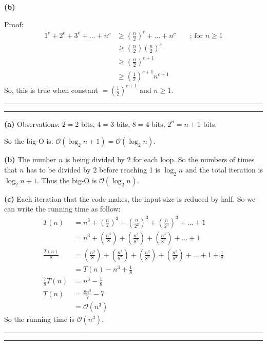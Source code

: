 \documentclass[a4paper, 12pt]{article}
\newcommand{\question}[1] {\vspace{.25in} \hrule\vspace{0.5em}
\noindent{\bf #1} \vspace{0.5em}
\hrule \vspace{.10in}}
\renewcommand{\part}[1] {\vspace{10pt} {\bf (#1)}}
\begin{document}
\part{b}

Proof:
\begin{align*}
	1^c + 2^c +3^c +...+n^c &\geqslant (\frac{n}{2})^c + ... + n^c && \text{ ; for } n\geqslant 1 \\
	&\geqslant (\frac{n}{2})(\frac{n}{2})^c \\
	& \geqslant (\frac{n}{2})^{c+1}\\
	& \geqslant (\frac{1}{2})^{c+1} n^{c+1}
\end{align*}
So, this is true when constant $= (\frac{1}{2})^{c+1}$ and $n \geqslant 1$.


\question{Problem 4}
\part{a} Observations: $2 = 2$ bits, $4 = 3$ bits, $8 = 4$ bits, $2^n = n+1$ bits.

So the big-O is: $\mathcal{O}(\log_2n + 1) =\mathcal{O}(\log_2n)$.

\part{b} The number $n$ is being divided by 2 for each loop. So the numbers of times that $n$ has to be divided by 2 before reaching 1 is $\log_2n$ and the total iteration is $\log_2n +1$. Thus the big-O is $\mathcal{O}(\log_2n)$.

\part{c} Each iteration that the code makes, the input size is reduced by half. So we can write the running time as follow:
\begin{align*}
	T(n) &= n^3 + (\frac{n}{2})^3 +(\frac{n}{2^2})^3 + (\frac{n}{2^3})^3 +... + 1\\
	&= n^3 + (\frac{n^3}{8}) + (\frac{n^3}{8^2})+(\frac{n^3}{8^3})+ ... + 1\\
	\frac{T(n)}{8} &= (\frac{n^3}{8}) +(\frac{n^3}{8^2})+(\frac{n^3}{8^3})+(\frac{n^3}{8^4}) +... + 1 + \frac{1}{8}\\
	&= T(n) -n^3 + \frac18\\
	\frac78T(n) &= n^3 - \frac18\\
	T(n) &= \frac{8n^3}{7} - 7 \\
	&= \mathcal{O}(n^3)
\end{align*}
So the running time is $\mathcal{O}(n^3)$.
\question{Problem 5}
\end{document}
